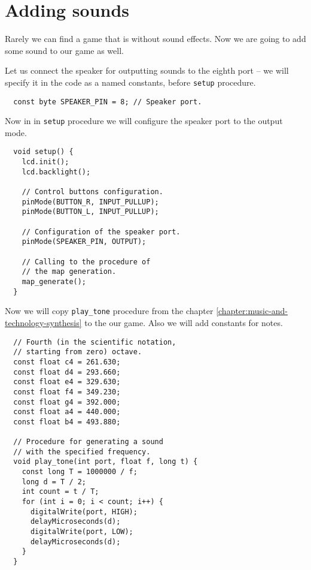 \documentclass[../sparc.tex]{subfiles}
\begin{document}
\section{Adding sounds}

Rarely we can find a game that is without sound effects.  Now we are going to
add some sound to our game as well.

Let us connect the speaker for outputting sounds to the eighth port -- we will
specify it in the code as a named constants, before \texttt{setup}
procedure.

\begin{verbatim}
  const byte SPEAKER_PIN = 8; // Speaker port.
\end{verbatim}

Now in in \texttt{setup} procedure we will configure the speaker port
to the output mode.

\begin{verbatim}
  void setup() {
    lcd.init();
    lcd.backlight();

    // Control buttons configuration.
    pinMode(BUTTON_R, INPUT_PULLUP);
    pinMode(BUTTON_L, INPUT_PULLUP);

    // Configuration of the speaker port.
    pinMode(SPEAKER_PIN, OUTPUT);

    // Calling to the procedure of
    // the map generation.
    map_generate();
  }
\end{verbatim}

Now we will copy \texttt{play_tone} procedure from the chapter
\ref{chapter:music-and-technology-synthesis} to the our game.  Also we will add
constants for notes.

\begin{verbatim}
  // Fourth (in the scientific notation,
  // starting from zero) octave.
  const float c4 = 261.630;
  const float d4 = 293.660;
  const float e4 = 329.630;
  const float f4 = 349.230;
  const float g4 = 392.000;
  const float a4 = 440.000;
  const float b4 = 493.880;

  // Procedure for generating a sound
  // with the specified frequency.
  void play_tone(int port, float f, long t) {
    const long T = 1000000 / f;
    long d = T / 2;
    int count = t / T;
    for (int i = 0; i < count; i++) {
      digitalWrite(port, HIGH);
      delayMicroseconds(d);
      digitalWrite(port, LOW);
      delayMicroseconds(d);
    }
  }
\end{verbatim}
\end{document}
